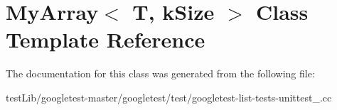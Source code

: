 \hypertarget{classMyArray}{}\section{My\+Array$<$ T, k\+Size $>$ Class Template Reference}
\label{classMyArray}


The documentation for this class was generated from the following file\+:\begin{DoxyCompactItemize}
\item 
test\+Lib/googletest-\/master/googletest/test/googletest-\/list-\/tests-\/unittest\+\_\+.\+cc\end{DoxyCompactItemize}
